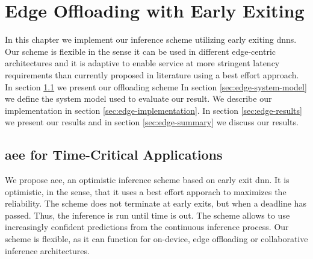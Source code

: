 \hypertarget{earlyexiting}{%
	\chapter{Edge Offloading with Early Exiting}\label{ch:edgeoffloading}}
\thispagestyle{fancy}

In this chapter we implement our inference scheme utilizing early exiting \gls{dnn}s. Our scheme is flexible in the sense it can be used in different edge-centric architectures and it is adaptive to enable service at more stringent latency requirements than currently proposed in literature using a best effort approach. In section \ref{sec:edge-aee} we present our offloading scheme In section \ref{sec:edge-system-model} we define the system model used to evaluate our result. We describe our implementation in section \ref{sec:edge-implementation}. In section \ref{sec:edge-results} we present our results and in section \ref{sec:edge-summary} we discuss our results.

\section{\acrfull{aee} for Time-Critical Applications} \label{sec:edge-aee}

We propose \acrfull{aee}, an optimistic inference scheme based on early exit \gls{dnn}. It is optimistic, in the sense, that it uses a best effort apporach to maximizes the reliability. The scheme does not terminate at early exits, but when a deadline has passed. Thus, the inference is run until time is out. The scheme allows to use increasingly confident predictions from the continuous inference process. Our scheme is flexible, as it can function for on-device, edge offloading or collaborative inference architectures. 

